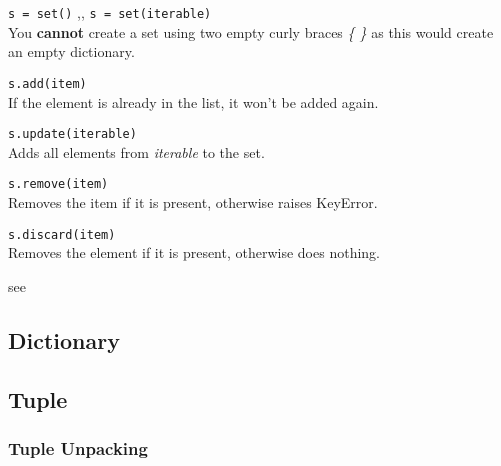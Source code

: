     \begin{itemize}
       \texttt{s = set()} \sep{,}
      \texttt{s = set(iterable)} \\
      You \textbf{cannot} create a set using two empty curly braces \textit{\{ \}} as this would
      create an empty dictionary.

       \texttt{s.add(item)} \\
      If the element is already in the list, it won't be added again.

       \texttt{s.update(iterable)} \\
      Adds all elements from \textit{iterable} to the set.

       \texttt{s.remove(item)} \\
      Removes the item if it is present, otherwise raises KeyError.

       \texttt{s.discard(item)} \\
      Removes the element if it is present, otherwise does nothing.

       see 
    \end{itemize}

  \subsection{Dictionary}

  \subsection{Tuple}

    \subsubsection{Tuple Unpacking}
    